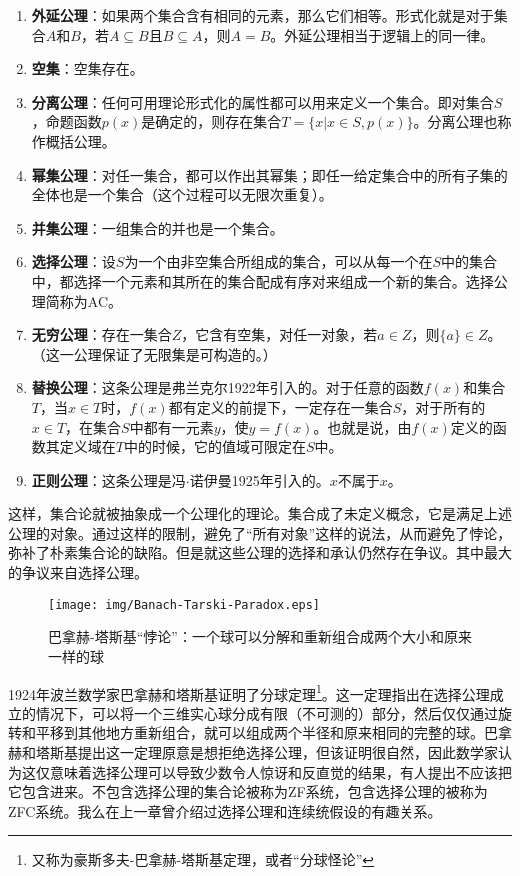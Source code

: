 \documentclass{article}
\begin{document}
\begin{enumerate}
\item \textbf{外延公理}：如果两个集合含有相同的元素，那么它们相等。形式化就是对于集合$A$和$B$，若$A \subseteq B$且$B \subseteq A$，则$A = B$。外延公理相当于逻辑上的同一律。
\item \textbf{空集}：空集存在。
\item \textbf{分离公理}：任何可用理论形式化的属性都可以用来定义一个集合。即对集合$S$，命题函数$p(x)$是确定的，则存在集合$T = \{ x | x \in S, p(x)\}$。分离公理也称作概括公理。
\item \textbf{幂集公理}：对任一集合，都可以作出其幂集；即任一给定集合中的所有子集的全体也是一个集合（这个过程可以无限次重复）。
\item \textbf{并集公理}：一组集合的并也是一个集合。
\item \textbf{选择公理}：设$S$为一个由非空集合所组成的集合，可以从每一个在$S$中的集合中，都选择一个元素和其所在的集合配成有序对来组成一个新的集合。选择公理简称为AC。
\item \textbf{无穷公理}：存在一集合$Z$，它含有空集，对任一对象，若$a \in Z$，则$\{a\} \in Z$。（这一公理保证了无限集是可构造的。）
\item \textbf{替换公理}：这条公理是弗兰克尔1922年引入的。对于任意的函数$f(x)$和集合$T$，当$x \in T$时，$f(x)$都有定义的前提下，一定存在一集合$S$，对于所有的$x \in T$，在集合$S$中都有一元素$y$，使$y = f(x)$。也就是说，由$f(x)$定义的函数其定义域在$T$中的时候，它的值域可限定在$S$中。
\item \textbf{正则公理}：这条公理是冯$\cdot$诺伊曼1925年引入的。$x$不属于$x$。
\end{enumerate}

这样，集合论就被抽象成一个公理化的理论。集合成了未定义概念，它是满足上述公理的对象。通过这样的限制，避免了“所有对象”这样的说法，从而避免了悖论，弥补了朴素集合论的缺陷。但是就这些公理的选择和承认仍然存在争议。其中最大的争议来自选择公理。

\begin{figure}[htbp]
 \centering
 \texttt{[image: img/Banach-Tarski-Paradox.eps]}
 \caption{巴拿赫-塔斯基“悖论”：一个球可以分解和重新组合成两个大小和原来一样的球}
 \label{fig:Banach-Tarski-Paradox}
\end{figure}

1924年波兰数学家巴拿赫和塔斯基证明了分球定理\footnote{又称为豪斯多夫-巴拿赫-塔斯基定理，或者“分球怪论”}。这一定理指出在选择公理成立的情况下，可以将一个三维实心球分成有限（不可测的）部分，然后仅仅通过旋转和平移到其他地方重新组合，就可以组成两个半径和原来相同的完整的球。巴拿赫和塔斯基提出这一定理原意是想拒绝选择公理，但该证明很自然，因此数学家认为这仅意味着选择公理可以导致少数令人惊讶和反直觉的结果，有人提出不应该把它包含进来。不包含选择公理的集合论被称为ZF系统，包含选择公理的被称为ZFC系统。我么在上一章曾介绍过选择公理和连续统假设的有趣关系。
\end{document}
